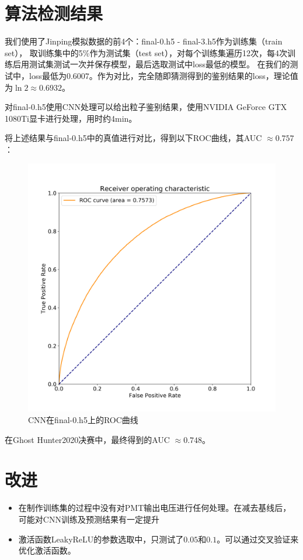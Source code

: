 \documentclass{ctexart}
\begin{document}
\section{算法检测结果}
我们使用了Jinping模拟数据的前4个：final-0.h5 - final-3.h5作为训练集（train set），
取训练集中的5\%作为测试集（test set），对每个训练集遍历12次，每4次训练后用测试集测试一次并保存模型，最后选取测试中loss最低的模型。
在我们的测试中，loss最低为$0.6007$。作为对比，完全随即猜测得到的鉴别结果的loss，理论值为$\ln{2}\approx0.6932$。

对final-0.h5使用CNN处理可以给出粒子鉴别结果，使用NVIDIA GeForce GTX 1080Ti显卡进行处理，用时约4min。

将上述结果与final-0.h5中的真值进行对比，得到以下ROC曲线，其AUC $\approx0.757$：
\begin{figure}[H]
    \centering
    \includegraphics[width=1.0\linewidth]{ROC.png}
    \caption{CNN在final-0.h5上的ROC曲线}
\end{figure}

在Ghost Hunter2020决赛中，最终得到的AUC $\approx0.748$。

\section{改进}
\begin{itemize}
    \item 在制作训练集的过程中没有对PMT输出电压进行任何处理。在减去基线后，可能对CNN训练及预测结果有一定提升
    \item 激活函数LeakyReLU的参数选取中，只测试了$0.05$和$0.1$。可以通过交叉验证来优化激活函数。
\end{itemize}

% 
\end{document}
